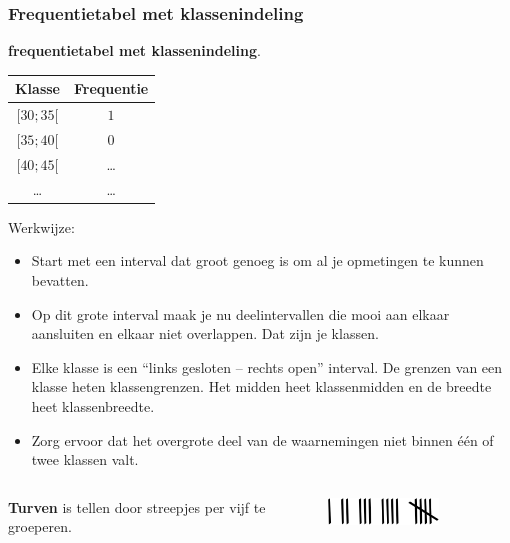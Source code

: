 \documentclass[dutch]{beamer}
\begin{document}
\begin{frame}
\frametitle{Frequentietabel met klassenindeling}
{\bf frequentietabel met klassenindeling}.

\begin{center}
  \begin{tabular}{|c|c|}
    \hline
    Klasse & Frequentie\\
    \hline
    $[30;35[$ & $1$\\    
    \hline
    $[35;40[$ & $0$\\
    \hline
    $[40;45[$ & \ldots\\ 
    \hline
    \ldots & \ldots\\ 
    \hline
  \end{tabular}
\end{center}

Werkwijze:
{\scriptsize
\begin{itemize}
  \item Start met een interval dat groot genoeg is om al je opmetingen te kunnen bevatten.
  \item Op dit grote interval maak je nu deelintervallen die mooi aan elkaar aansluiten en elkaar niet
overlappen. Dat zijn je klassen.
  \item Elke klasse is een “links gesloten – rechts open” interval. De
grenzen van een klasse heten klassengrenzen. Het midden heet klassenmidden en de
breedte heet klassenbreedte.
  \item Zorg ervoor dat het overgrote deel van de waarnemingen niet binnen één of twee klassen
valt.
\end{itemize}
}

\pause
\begin{columns}
\begin{column}{0.6\textwidth}
{\bf Turven} is tellen door streepjes per vijf te groeperen.
\end{column}
\begin{column}{0.4\textwidth}
  \includegraphics[width=0.6\textwidth]{turven}
\end{column}
\end{columns}
\end{frame}
\end{document}
